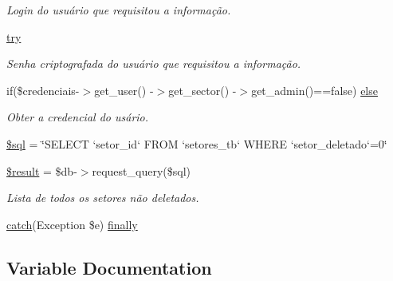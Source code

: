 \begin{DoxyCompactItemize}
\begin{DoxyCompactList}\small\item\em Login do usuário que requisitou a informação. \end{DoxyCompactList}\item 
\hyperlink{menu_2configuracoes_2setores_2index_8php_abe4cc9788f52e49485473dc699537388}{try}
\begin{DoxyCompactList}\small\item\em Senha criptografada do usuário que requisitou a informação. \end{DoxyCompactList}\item 
if(\$credenciais-\/$>$get\+\_\+user() -\/$>$get\+\_\+sector() -\/$>$get\+\_\+admin()==false) \hyperlink{menu_2configuracoes_2setores_2index_8php_aabe0fce4e8f9f822b09141ab57d918d9}{else}
\begin{DoxyCompactList}\small\item\em Obter a credencial do usário. \end{DoxyCompactList}\item 
\hyperlink{menu_2configuracoes_2setores_2index_8php_a047170d6020a882807665812a27e2525}{\$sql} = \char`\"{}S\+E\+L\+E\+CT `setor\+\_\+id` F\+R\+OM `setores\+\_\+tb` W\+H\+E\+RE `setor\+\_\+deletado`=0\char`\"{}
\item 
\hyperlink{menu_2configuracoes_2setores_2index_8php_a112ef069ddc0454086e3d1e6d8d55d07}{\$result} = \$db-\/$>$request\+\_\+query(\$sql)
\begin{DoxyCompactList}\small\item\em Lista de todos os setores não deletados. \end{DoxyCompactList}\item 
\hyperlink{imprimir_2ficha_2index_8php_a8104793004944f01dd070fc8b1ade3c4}{catch}(Exception \$e) \hyperlink{menu_2configuracoes_2setores_2index_8php_a1eb47d68a4a4f73debf91b15e179d813}{finally}
\end{DoxyCompactItemize}


\subsection{Variable Documentation}
\mbox{\label{menu_2configuracoes_2setores_2index_8php_a26b9f9373f7bb79dfcf8a86dff086b45}} 
